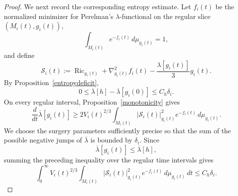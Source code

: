 \documentclass{amsart}
\begin{document}
\begin{proof}
\noindent
We next record the corresponding entropy estimate. Let \(f_i(t)\) be
the normalized minimizer for Perelman's \(\lambda\)-functional on the
regular slice \((M_i(t),g_i(t))\),
\[
        \int_{M_i(t)}e^{-f_i(t)}\,d\mu_{g_i(t)}=1,
\]
and define
\[
        \mathcal S_i(t)
        :=
        \operatorname{Ric}_{g_i(t)}
        +
        \nabla^2_{g_i(t)}f_i(t)
        -
        \frac{\lambda[g_i(t)]}{3}g_i(t).
\]
By Proposition~\ref{entropydeficit},
\[
        0\leq
        \overline\lambda[h]-\overline\lambda[g_i(0)]
        \leq C_h\delta_i.
\]
On every regular interval, Proposition~\ref{monotonicity} gives
\[
        \frac{d}{dt}\overline\lambda[g_i(t)]
        \geq
        2V_i(t)^{2/3}
        \int_{M_i(t)}
        |\mathcal S_i(t)|_{g_i(t)}^2
        e^{-f_i(t)}\,d\mu_{g_i(t)}.
\]
We choose the surgery parameters sufficiently precise so that the sum
of the possible negative jumps of \(\overline\lambda\) is bounded by
\(\delta_i\). Since
\[
        \overline\lambda[g_i(t)]
        \leq\overline\lambda[h],
\]
summing the preceding inequality over the regular time intervals gives
\begin{equation}
\label{eq:late-entropy-budget}
        \int_0^\infty
        V_i(t)^{2/3}
        \int_{M_i(t)}
        |\mathcal S_i(t)|_{g_i(t)}^2
        e^{-f_i(t)}\,d\mu_{g_i(t)}\,dt
        \leq C_h\delta_i.
\end{equation}


\end{proof}
\end{document}
